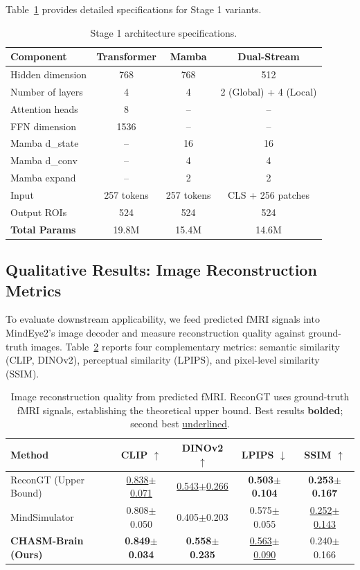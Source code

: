 Table~\ref{tab:supp_arch_details} provides detailed specifications for Stage 1 variants.

\begin{table}[h]
\centering
\caption{Stage 1 architecture specifications.}
\label{tab:supp_arch_details}
\begin{tabular}{lccc}
\toprule
\textbf{Component} & \textbf{Transformer} & \textbf{Mamba} & \textbf{Dual-Stream} \\
\midrule
Hidden dimension & 768 & 768 & 512 \\
Number of layers & 4 & 4 & 2 (Global) + 4 (Local) \\
Attention heads & 8 & -- & -- \\
FFN dimension & 1536 & -- & -- \\
Mamba d\_state & -- & 16 & 16 \\
Mamba d\_conv & -- & 4 & 4 \\
Mamba expand & -- & 2 & 2 \\
Input & 257 tokens & 257 tokens & CLS + 256 patches \\
Output ROIs & 524 & 524 & 524 \\
\midrule
\textbf{Total Params} & 19.8M & 15.4M & 14.6M \\
\bottomrule
\end{tabular}
\end{table}


\subsection{Qualitative Results: Image Reconstruction Metrics}
\label{sec:supp_image_quality}

To evaluate downstream applicability, we feed predicted fMRI signals into MindEye2's
image decoder and measure reconstruction quality against ground-truth images.
Table~\ref{tab:supp_image_quality} reports four complementary metrics:
semantic similarity (CLIP, DINOv2), perceptual similarity (LPIPS), and pixel-level similarity (SSIM).

\begin{table}[h]
\centering
\caption{Image reconstruction quality from predicted fMRI.
ReconGT uses ground-truth fMRI signals, establishing the theoretical upper bound.
Best results \textbf{bolded}; second best \underline{underlined}.}
\label{tab:supp_image_quality}
\begin{tabular}{lcccc}
\toprule
\textbf{Method} & \textbf{CLIP} $\uparrow$ & \textbf{DINOv2} $\uparrow$ & \textbf{LPIPS} $\downarrow$ & \textbf{SSIM} $\uparrow$ \\
\midrule
ReconGT (Upper Bound) & \underline{0.838$\pm$0.071} & \underline{0.543$\pm$0.266} & \textbf{0.503$\pm$0.104} & \textbf{0.253$\pm$0.167} \\
MindSimulator & 0.808$\pm$0.050 & 0.405$\pm$0.203 & 0.575$\pm$0.055 & \underline{0.252$\pm$0.143} \\
\midrule
\textbf{CHASM-Brain (Ours)} & \textbf{0.849$\pm$0.034} & \textbf{0.558$\pm$0.235} & \underline{0.563$\pm$0.090} & 0.240$\pm$0.166 \\
\bottomrule
\end{tabular}
\end{table}

